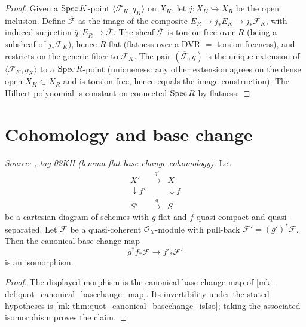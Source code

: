 \begin{proof}

  Given a \(\operatorname{Spec} K\)-point \(\langle \mathcal{F}_K, q_K\rangle\) on \(X_K\),
  let \(j : X_K \hookrightarrow X_R\) be the open inclusion. Define
  \(\overline{\mathcal{F}}\) as the image of the composite
  \(E_R \to j_* E_K \to j_* \mathcal{F}_K\), with induced surjection
  \(\overline{q} : E_R \to \overline{\mathcal{F}}\). The sheaf
  \(\overline{\mathcal{F}}\) is torsion-free over \(R\) (being a subsheaf of
  \(j_* \mathcal{F}_K\)), hence \(R\)-flat (flatness over a DVR
  \(=\) torsion-freeness), and restricts on the generic fiber to
  \(\mathcal{F}_K\). The pair \((\overline{\mathcal{F}}, \overline{q})\) is
  the unique extension of \(\langle \mathcal{F}_K, q_K\rangle\) to a
  \(\operatorname{Spec} R\)-point (uniqueness: any other extension agrees on the dense
  open \(X_K \subset X_R\) and is torsion-free, hence equals the image
  construction). The Hilbert polynomial is constant on connected
  \(\operatorname{Spec} R\) by flatness.
\end{proof}

\section{Cohomology and base change}
\label{mk-sec:quot_iter195_bc_substrate}
\label{mk-sec:cohomology_base_change}


\begin{theorem}\label{mk-thm:flat_base_change_cohomology}
  \leanok

  \textit{Source: \cite{stacks-project}, tag 02KH (lemma-flat-base-change-cohomology).}
  Let
  \[
    \begin{array}{ccc}
      X' & \xrightarrow{g'} & X \\
      \downarrow f' &  & \downarrow f \\
      S' & \xrightarrow{g} & S
    \end{array}
  \]
  be a cartesian diagram of schemes with \(g\) flat and \(f\) quasi-compact and
  quasi-separated. Let \(\mathcal{F}\) be a quasi-coherent
  \(\mathcal{O}_X\)-module with pull-back
  \(\mathcal{F}' = (g')^* \mathcal{F}\). Then the canonical base-change map
  \[
    g^* f_* \mathcal{F} \longrightarrow f'_* \mathcal{F}'
  \]
  is an isomorphism.
\end{theorem}
\begin{proof}
  \leanok{}
  The displayed morphism is the canonical base-change map of
  \ref{mk-def:quot_canonical_basechange_map}. Its invertibility under the stated
  hypotheses is \ref{mk-thm:quot_canonical_basechange_isIso}; taking the associated
  isomorphism proves the claim.
\end{proof}

